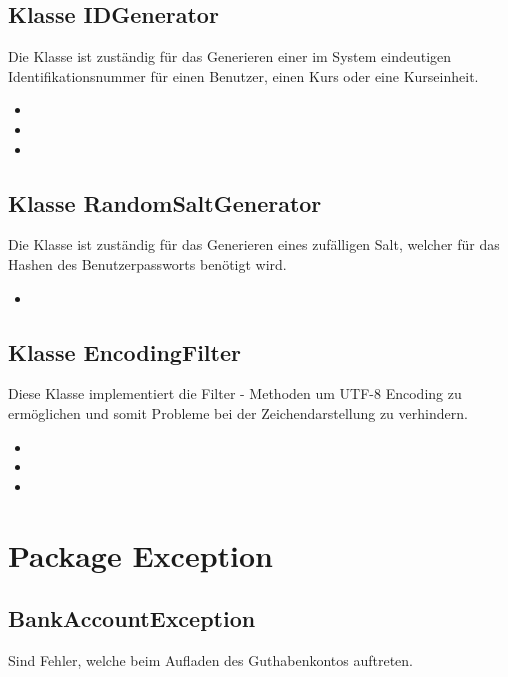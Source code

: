 	\subsection{Klasse IDGenerator}
	Die Klasse ist zuständig für das Generieren einer im System eindeutigen Identifikationsnummer für einen Benutzer, einen Kurs oder eine Kurseinheit.
	\begin{itemize}
		\item {}
		\item {}
		\item {}
	\end{itemize}
	
	\subsection{Klasse RandomSaltGenerator}
	Die Klasse ist zuständig für das Generieren eines zufälligen Salt, welcher für das Hashen des Benutzerpassworts benötigt wird.
	\begin{itemize}
		\item {}
	\end{itemize} 
	
	\subsection{Klasse EncodingFilter}
	Diese Klasse implementiert die Filter - Methoden um UTF-8 Encoding zu
	ermöglichen und somit Probleme bei der Zeichendarstellung zu verhindern.
	\begin{itemize}
		\item \override
		\item \override
		\item \override
	\end{itemize}
	
	\section{Package Exception}
	\subsection{BankAccountException}
	Sind Fehler, welche beim Aufladen des Guthabenkontos auftreten. 
	
